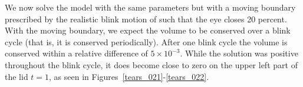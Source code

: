 We now solve the model with the same parameters but with a moving boundary prescribed by the realistic blink motion of \cite{deng2014heat} such that the eye closes 20 percent. With the moving boundary, we expect the volume to be conserved over a blink cycle (that is, it is conserved periodically). After one blink cycle the volume is conserved within a relative difference of $5 \times 10^{-3}$. While the solution was positive throughout the blink cycle, it does become close to zero on the upper left part of the lid $t=1$, as seen in Figures~\ref{tears_021}-\ref{tears_022}.


%	

